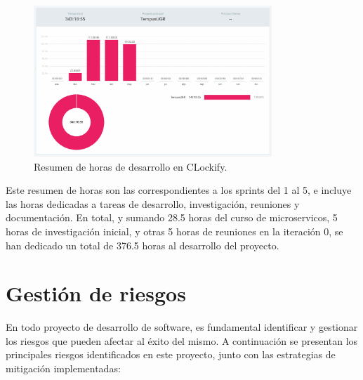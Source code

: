 \begin{figure}[H] 
    \centering 
    \includegraphics[width=0.8\textwidth]{figures/05_clockify.png}
    \caption{Resumen de horas de desarrollo en CLockify.} %
    \label{clockify} %
\end{figure}

Este resumen de horas son las correspondientes a los sprints del 1 al 5, e incluye las horas dedicadas a tareas de desarrollo, investigación, reuniones y documentación. En total, y sumando 28.5 horas del curso de microservicos, 5 horas de investigación inicial, y otras 5 horas de reuniones en la iteración 0, se han dedicado un total de 376.5 horas al desarrollo del proyecto.

\section{Gestión de riesgos}

En todo proyecto de desarrollo de software, es fundamental identificar y gestionar los riesgos que pueden afectar al éxito del mismo. A continuación se presentan los principales riesgos identificados en este proyecto, junto con las estrategias de mitigación implementadas:

